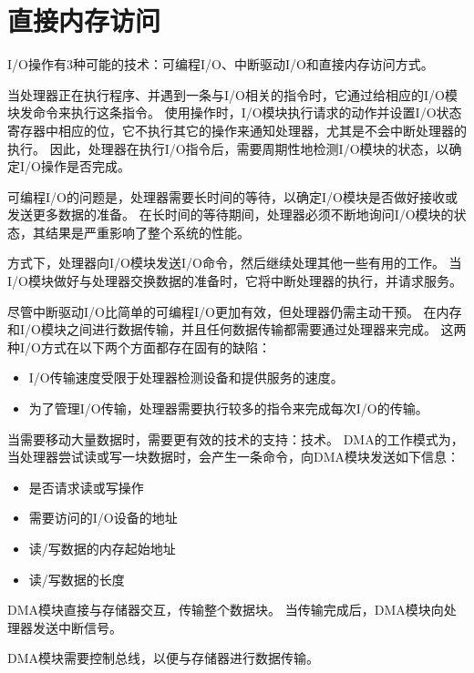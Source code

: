 
\section{直接内存访问}
{
    I/O操作有3种可能的技术：可编程I/O、中断驱动I/O和直接内存访问方式。

    当处理器正在执行程序、并遇到一条与I/O相关的指令时，它通过给相应的I/O模块发命令来执行这条指令。
    使用操作时，I/O模块执行请求的动作并设置I/O状态寄存器中相应的位，它不执行其它的操作来通知处理器，尤其是不会中断处理器的执行。
    因此，处理器在执行I/O指令后，需要周期性地检测I/O模块的状态，以确定I/O操作是否完成。

    可编程I/O的问题是，处理器需要长时间的等待，以确定I/O模块是否做好接收或发送更多数据的准备。
    在长时间的等待期间，处理器必须不断地询问I/O模块的状态，其结果是严重影响了整个系统的性能。

    方式下，处理器向I/O模块发送I/O命令，然后继续处理其他一些有用的工作。
    当I/O模块做好与处理器交换数据的准备时，它将中断处理器的执行，并请求服务。

    尽管中断驱动I/O比简单的可编程I/O更加有效，但处理器仍需主动干预。
    在内存和I/O模块之间进行数据传输，并且任何数据传输都需要通过处理器来完成。
    这两种I/O方式在以下两个方面都存在固有的缺陷：

    \begin{itemize}
        \item I/O传输速度受限于处理器检测设备和提供服务的速度。
        \item 为了管理I/O传输，处理器需要执行较多的指令来完成每次I/O的传输。
    \end{itemize}

    当需要移动大量数据时，需要更有效的技术的支持：技术。
    DMA的工作模式为，当处理器尝试读或写一块数据时，会产生一条命令，向DMA模块发送如下信息：

    \begin{itemize}
        \item 是否请求读或写操作
        \item 需要访问的I/O设备的地址
        \item 读/写数据的内存起始地址
        \item 读/写数据的长度
    \end{itemize}

    DMA模块直接与存储器交互，传输整个数据块。
    当传输完成后，DMA模块向处理器发送中断信号。

    DMA模块需要控制总线，以便与存储器进行数据传输。
}
